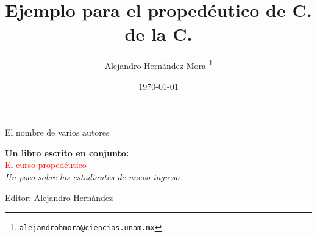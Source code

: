 \documentclass[oneside]{book}
\title{Ejemplo para el propedéutico de C. de la C.}
\author{Alejandro Hernández Mora \thanks{\texttt{alejandrohmora@ciencias.unam.mx}}}
\date{\today}
\theoremstyle{definition}
\begin{document}

\begin{titlepage} %

  \raggedleft %
  
  \vspace*{\baselineskip} %
  
  
  {\Large El nombre de varios autores} %
  
  \vspace*{0.167\textheight} %
  
  
  \textbf{\LARGE Un libro escrito en conjunto:}\\[\baselineskip] %
  
  {\textcolor{Red}{\Huge El curso propedéutico}}\\[\baselineskip] %
  
  {\Large \textit{Un poco sobre los estudiantes de nuevo ingreso}} %
  
  \vfill %
  
  
  {\large Editor: Alejandro Hernández~~\plogo} %
  
  \vspace*{3\baselineskip} %

\end{titlepage}

\tableofcontents %


\listoffigures %


\listoftables %
\end{document}
